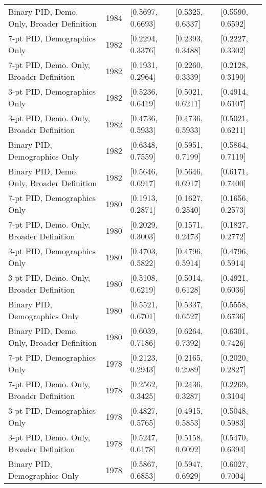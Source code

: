 \begin{longtable}{lrlll}
  Binary PID, Demo. Only, Broader Definition & 1984 & [0.5697, 0.6693] & [0.5325, 0.6337] & [0.5590, 0.6592] \\ 
  7-pt PID, Demographics Only & 1982 & [0.2294, 0.3376] & [0.2393, 0.3488] & [0.2227, 0.3302] \\ 
  7-pt PID, Demo. Only, Broader Definition & 1982 & [0.1931, 0.2964] & [0.2260, 0.3339] & [0.2128, 0.3190] \\ 
  3-pt PID, Demographics Only & 1982 & [0.5236, 0.6419] & [0.5021, 0.6211] & [0.4914, 0.6107] \\ 
  3-pt PID, Demo. Only, Broader Definition & 1982 & [0.4736, 0.5933] & [0.4736, 0.5933] & [0.5021, 0.6211] \\ 
  Binary PID, Demographics Only & 1982 & [0.6348, 0.7559] & [0.5951, 0.7199] & [0.5864, 0.7119] \\ 
  Binary PID, Demo. Only, Broader Definition & 1982 & [0.5646, 0.6917] & [0.5646, 0.6917] & [0.6171, 0.7400] \\ 
  7-pt PID, Demographics Only & 1980 & [0.1913, 0.2871] & [0.1627, 0.2540] & [0.1656, 0.2573] \\ 
  7-pt PID, Demo. Only, Broader Definition & 1980 & [0.2029, 0.3003] & [0.1571, 0.2473] & [0.1827, 0.2772] \\ 
  3-pt PID, Demographics Only & 1980 & [0.4703, 0.5822] & [0.4796, 0.5914] & [0.4796, 0.5914] \\ 
  3-pt PID, Demo. Only, Broader Definition & 1980 & [0.5108, 0.6219] & [0.5014, 0.6128] & [0.4921, 0.6036] \\ 
  Binary PID, Demographics Only & 1980 & [0.5521, 0.6701] & [0.5337, 0.6527] & [0.5558, 0.6736] \\ 
  Binary PID, Demo. Only, Broader Definition & 1980 & [0.6039, 0.7186] & [0.6264, 0.7392] & [0.6301, 0.7426] \\ 
  7-pt PID, Demographics Only & 1978 & [0.2123, 0.2943] & [0.2165, 0.2989] & [0.2020, 0.2827] \\ 
  7-pt PID, Demo. Only, Broader Definition & 1978 & [0.2562, 0.3425] & [0.2436, 0.3287] & [0.2269, 0.3104] \\ 
  3-pt PID, Demographics Only & 1978 & [0.4827, 0.5765] & [0.4915, 0.5853] & [0.5048, 0.5983] \\ 
  3-pt PID, Demo. Only, Broader Definition & 1978 & [0.5247, 0.6178] & [0.5158, 0.6092] & [0.5470, 0.6394] \\ 
  Binary PID, Demographics Only & 1978 & [0.5867, 0.6853] & [0.5947, 0.6929] & [0.6027, 0.7004] \\ 

\end{longtable}
